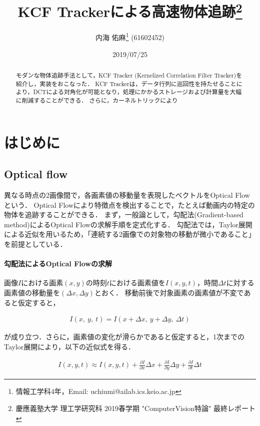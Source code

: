 \documentclass[11pt,a4j]{jarticle}
\title{{KCF Trackerによる高速物体追跡}\thanks{慶應義塾大学 理工学研究科 2019春学期 "ComputerVision特論" 最終レポート} \\ }
\author{内海 佑麻\thanks{情報工学科4年，Email: uchiumi@ailab.ics.keio.ac.jp} (61602452)}
\date{2019/07/25}
\begin{document}
  \maketitle
  \begin{abstract}
    モダンな物体追跡手法として，KCF Tracker (Kernelized Correlation Filter Tracker)を紹介し，実装をおこなった．
    KCF Trackerは，データ行列に巡回性を持たせることにより，DCTによる対角化が可能となり，処理にかかるストレージおよび計算量を大幅に削減することができる．
    さらに，カーネルトリックにより
  \end{abstract}
  \tableofcontents

  \newpage

  \section{はじめに}

    \subsection{Optical flow}
      異なる時点の2画像間で，各画素値の移動量を表現したベクトルをOptical Flowという．
      Optical Flowにより特徴点を検出することで，たとえば動画内の特定の物体を追跡することができる．
      まず，一般論として，勾配法(Gradient-based method)によるOptical Flowの求解手順を定式化する．
      勾配法では，Taylor展開による近似を用いるため，「連続する2画像での対象物の移動が微小であること」を前提としている．

      \paragraph{勾配法によるOptical Flowの求解}
      画像$I$における画素$(x,y)$の時刻$t$における画素値を$I(x,y,t)$，時間$\Delta t$に対する画素値の移動量を$(\Delta x, \Delta y)$とおく．
      移動前後で対象画素の画素値が不変であると仮定すると，

      \begin{align}
        I(x, ~ y, ~ t) = I(x + \Delta x, ~ y + \Delta y, ~ \Delta t)
      \end{align}

      が成り立つ．さらに，画素値の変化が滑らかであると仮定すると，1次までのTaylor展開により，以下の近似式を得る．

      \begin{align}
        I(x,y,t) \approx I(x,y,t) + \frac{\partial I}{\partial x} \Delta x + \frac{\partial I}{\partial y} \Delta y + \frac{\partial I}{\partial t} \Delta t
      \end{align}
\end{document}
